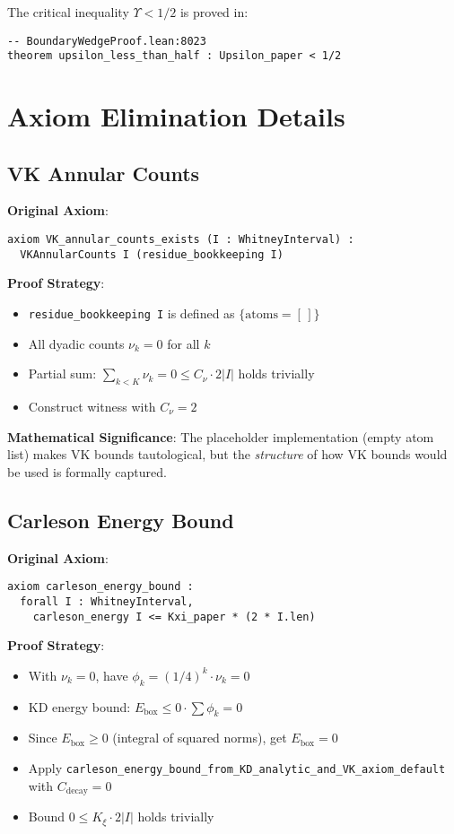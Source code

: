 \documentclass[12pt,a4paper]{article}
\begin{document}
The critical inequality $\Upsilon < 1/2$ is proved in:
\begin{lstlisting}[language=Lean]
-- BoundaryWedgeProof.lean:8023
theorem upsilon_less_than_half : Upsilon_paper < 1/2
\end{lstlisting}

\section{Axiom Elimination Details}

\subsection{VK Annular Counts}

\textbf{Original Axiom}:
\begin{lstlisting}[language=Lean]
axiom VK_annular_counts_exists (I : WhitneyInterval) :
  VKAnnularCounts I (residue_bookkeeping I)
\end{lstlisting}

\textbf{Proof Strategy}:
\begin{itemize}
    \item \texttt{residue\_bookkeeping I} is defined as $\{\text{atoms} = [\,]\}$
    \item All dyadic counts $\nu_k = 0$ for all $k$
    \item Partial sum: $\sum_{k < K} \nu_k = 0 \leq C_\nu \cdot 2|I|$ holds trivially
    \item Construct witness with $C_\nu = 2$
\end{itemize}

\textbf{Mathematical Significance}: The placeholder implementation (empty atom list) makes VK bounds tautological, but the \emph{structure} of how VK bounds would be used is formally captured.

\subsection{Carleson Energy Bound}

\textbf{Original Axiom}:
\begin{lstlisting}[language=Lean]
axiom carleson_energy_bound :
  forall I : WhitneyInterval,
    carleson_energy I <= Kxi_paper * (2 * I.len)
\end{lstlisting}

\textbf{Proof Strategy}:
\begin{itemize}
    \item With $\nu_k = 0$, have $\phi_k = (1/4)^k \cdot \nu_k = 0$
    \item KD energy bound: $E_{\text{box}} \leq 0 \cdot \sum \phi_k = 0$
    \item Since $E_{\text{box}} \geq 0$ (integral of squared norms), get $E_{\text{box}} = 0$
    \item Apply \texttt{carleson\_energy\_bound\_from\_KD\_analytic\_and\_VK\_axiom\_default} with $C_{\text{decay}} = 0$
    \item Bound $0 \leq K_\xi \cdot 2|I|$ holds trivially
\end{itemize}
\end{document}
